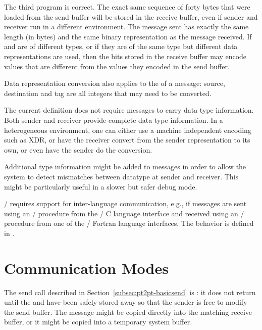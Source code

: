 The third program is correct.  The exact same
sequence of forty bytes that were loaded from the send buffer will be
stored in the receive buffer, even
if sender and receiver run in a different environment.  The message
sent has exactly the same length (in bytes) and the same binary
representation as the message received.  If  and  are
of different types,
or if they are of the same type but different data representations are used,
then the bits stored in the receive buffer may encode values that are
different from the values they encoded in the send buffer.


Data representation conversion also applies to the  of a message:
source, destination and tag are all integers that may need to be converted.

\begin{implementors}
The current definition does not require messages to carry data
type information.  Both sender and receiver provide complete data
type information.
In a heterogeneous environment, one can either use
a machine independent encoding
such as XDR, or have the receiver convert from the sender representation to its
own, or even have the sender do the conversion.

Additional type information might be added to messages
in order to allow the system to detect mismatches between
datatype at sender and receiver.
This might be particularly useful in a slower but safer debug mode.
\end{implementors}

\MPI/ requires support for inter-language communication, e.g.,
if messages are sent
using an \MPI/ procedure from the \MPI/ C language interface
and received
using an \MPI/ procedure from one of the \MPI/ Fortran language interfaces.
The behavior is defined in
.


\section{Communication Modes}
\label{sec:pt2pt-modes}

The send call described in Section~\ref{subsec:pt2pt-basicsend}
is :
it does not return until the 
and  have been safely stored away so that the sender is
free to modify
the send buffer.
The message might be copied directly into the matching receive buffer,
or it might be copied into a temporary system buffer.

